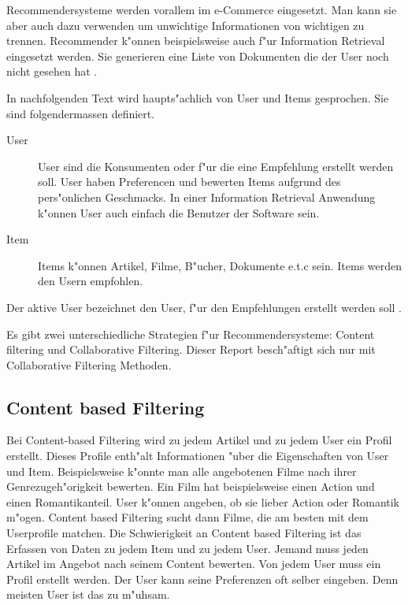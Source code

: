 \documentclass[a4paper, 12pt]{article}
\begin{document}
Recommendersysteme werden vorallem im e-Commerce eingesetzt. Man kann sie aber auch dazu verwenden um unwichtige Informationen von wichtigen zu trennen. Recommender k"onnen beispielsweise auch f"ur Information Retrieval eingesetzt werden. Sie generieren eine Liste von Dokumenten die der User noch nicht gesehen hat \cite{herlocker00}.

In nachfolgenden Text wird haupts"achlich von User und Items gesprochen. Sie sind folgendermassen definiert.

\begin{description}
\item[User] User sind die Konsumenten oder f"ur die eine Empfehlung erstellt werden soll. 
User haben Preferencen und bewerten Items aufgrund des pers"onlichen Geschmacks. In einer Information Retrieval Anwendung k"onnen User auch einfach die Benutzer der Software sein.
\item[Item] 
Items k"onnen Artikel, Filme, B"ucher, Dokumente e.t.c sein. Items werden den Usern empfohlen.
\end{description}

Der aktive User bezeichnet den User, f"ur den Empfehlungen erstellt werden soll \cite{jannach11}.

Es gibt zwei unterschiedliche Strategien f"ur Recommendersysteme: Content filtering und Collaborative Filtering. Dieser Report besch"aftigt sich nur mit Collaborative Filtering Methoden. 

\subsection{Content based Filtering}
\label{sec:contentbased}

Bei Content-based Filtering wird zu jedem Artikel und zu jedem User ein Profil erstellt. Dieses Profile enth"alt Informationen "uber die Eigenschaften von User und Item. Beispielsweise k"onnte man alle angebotenen Filme nach ihrer Genrezugeh"origkeit bewerten. Ein Film hat beispielsweise einen Action und einen Romantikanteil. User k"onnen angeben, ob sie lieber Action oder Romantik m"ogen. Content based Filtering sucht dann Filme, die am besten mit dem Userprofile matchen. Die Schwierigkeit an Content based Filtering ist das Erfassen von Daten zu jedem Item und zu jedem User. Jemand muss jeden Artikel im Angebot nach seinem Content bewerten. Von jedem User muss ein Profil erstellt werden. Der User kann seine Preferenzen oft selber eingeben. Denn meisten User ist das zu m"uhsam.
\end{document}
